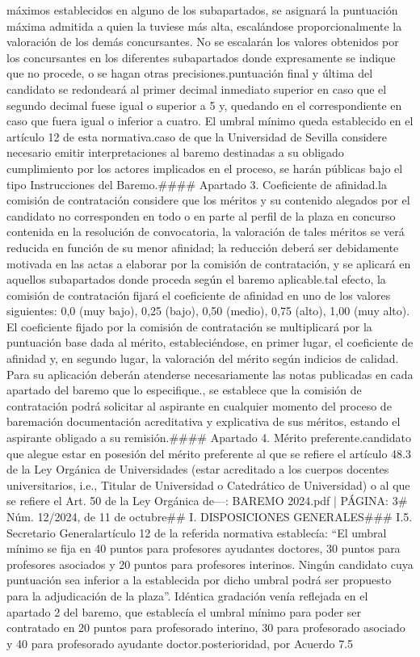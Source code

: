 \documentclass{article}
\begin{document}
\begin{itemize}
{{{{{{{{máximos establecidos en alguno de los subapartados, se asignará la puntuación máxima admitida a quien la tuviese más alta, escalándose proporcionalmente la valoración de los demás concursantes. No se escalarán los valores obtenidos por los concursantes en los diferentes subapartados donde expresamente se indique que no procede, o se hagan otras precisiones.\n\nLa puntuación final y última del candidato se redondeará al primer decimal inmediato superior en caso que el segundo decimal fuese igual o superior a 5 y, quedando en el correspondiente en caso que fuera igual o inferior a cuatro. El umbral mínimo queda establecido en el artículo 12 de esta normativa.\n\nEn caso de que la Universidad de Sevilla considere necesario emitir interpretaciones al baremo destinadas a su obligado cumplimiento por los actores implicados en el proceso, se harán públicas bajo el tipo Instrucciones del Baremo.\n\n#### Apartado 3. Coeficiente de afinidad.\n\nCuando la comisión de contratación considere que los méritos y su contenido alegados por el candidato no corresponden en todo o en parte al perfil de la plaza en concurso contenida en la resolución de convocatoria, la valoración de tales méritos se verá reducida en función de su menor afinidad; la reducción deberá ser debidamente motivada en las actas a elaborar por la comisión de contratación, y se aplicará en aquellos subapartados donde proceda según el baremo aplicable.\n\nA tal efecto, la comisión de contratación fijará el coeficiente de afinidad en uno de los valores siguientes: 0,0 (muy bajo), 0,25 (bajo), 0,50 (medio), 0,75 (alto), 1,00 (muy alto). El coeficiente fijado por la comisión de contratación se multiplicará por la puntuación base dada al mérito, estableciéndose, en primer lugar, el coeficiente de afinidad y, en segundo lugar, la valoración del mérito según indicios de calidad. Para su aplicación deberán atenderse necesariamente las notas publicadas en cada apartado del baremo que lo especifique.\n\nAsimismo, se establece que la comisión de contratación podrá solicitar al aspirante en cualquier momento del proceso de baremación documentación acreditativa y explicativa de sus méritos, estando el aspirante obligado a su remisión.\n\n#### Apartado 4. Mérito preferente.\n\nEl candidato que alegue estar en posesión del mérito preferente al que se refiere el artículo 48.3 de la Ley Orgánica de Universidades (estar acreditado a los cuerpos docentes universitarios, i.e., Titular de Universidad o Catedrático de Universidad) o al que se refiere el Art. 50 de la Ley Orgánica de\n\n---\n\nFUENTE: BAREMO 2024.pdf | PÁGINA: 3\n# Núm. 12/2024, de 11 de octubre\n\n## I. DISPOSICIONES GENERALES\n\n### I.5. Secretario General\n\nEl artículo 12 de la referida normativa establecía: “El umbral mínimo se fija en 40 puntos para profesores ayudantes doctores, 30 puntos para profesores asociados y 20 puntos para profesores interinos. Ningún candidato cuya puntuación sea inferior a la establecida por dicho umbral podrá ser propuesto para la adjudicación de la plaza”. Idéntica gradación venía reflejada en el apartado 2 del baremo, que establecía el umbral mínimo para poder ser contratado en 20 puntos para profesorado interino, 30 para profesorado asociado y 40 para profesorado ayudante doctor.\n\nCon posterioridad, por Acuerdo 7.5 }}}}}}}}
\end{itemize}
\end{document}
